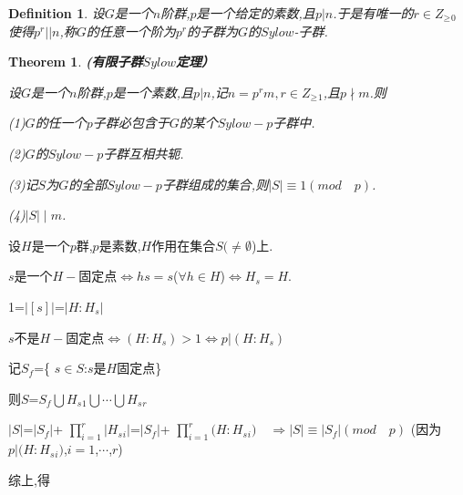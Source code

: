 \documentclass[UTF8]{article}
\newtheorem{thm}{Theorem}[section]
\newtheorem{defn}{Definition}[section]
\begin{document}
\begin{defn}
	
	设$G$是一个$n$阶群,$p$是一个给定的素数,且$p|n$.于是有唯一的$r\in Z_ \geq$$_0$使得$p^r||n$,称$G$的任意一个阶为$p^r$的子群为$G$的$Sylow$-子群.
\end{defn}

\begin{thm}
	\textbf{(有限子群$Sylow$定理）}
	
	设$G$是一个$n$阶群,$p$是一个素数,且$p|n$,记$n=p^rm,r\in Z_ \geq$$_1$,且$p\nmid m$.则
	
	(1)$G$的任一个$p$子群必包含于$G$的某个$Sylow-p$子群中.
	
	(2)$G$的$Sylow-p$子群互相共轭.
	
	(3)记$S$为$G$的全部$Sylow-p$子群组成的集合,则$|S|\equiv 1(mod\quad p)$.
	
	(4)$|S|\mid m$.
\end{thm}


设$H$是一个$p$群,$p$是素数,$H$作用在集合$S(\neq$$\emptyset$)上.

$s$是一个$H-$固定点$\iff$$hs=s$(${\forall}$$h\in H$)$\iff$$H_s=H$.

1=$|[s]|$=$|H:H_s|$

$s$不是$H-$固定点$\iff$$(H:H_s)>1$$\iff$$p|(H:H_s)$

记$S_f$=\{ $s\in S$:$s$是$H$固定点\}

则\qquad $S$=$S_f\bigcup H$$_s$$_1$$\bigcup$$ \cdots$$ \bigcup$$H_s$$_r$

$|S|$=$|S_f|$+ $\prod_{i=1}^r|H_s$$_i|$=$|S_f|$+ $\prod_{i=1}^r(H:H_s$$_i)$$\quad$$\Rightarrow |S|\equiv |S_f|(mod\quad p)$ (因为$p|(H:H_s$$_i)$,$i=1$,$ \cdots$,$r$)

综上,得
\end{document}
